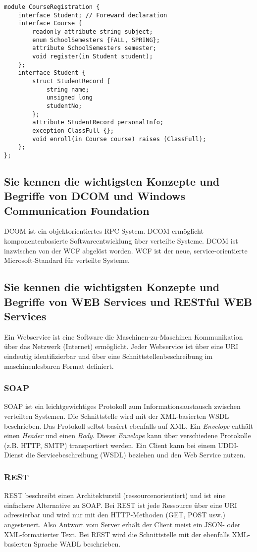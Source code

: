 \begin{lstlisting}[language=IDL, caption={Interface Definition Language (IDL) Beispiel}, label=lst:idl]
module CourseRegistration { 
	interface Student; // Foreward declaration 
	interface Course { 
		readonly attribute string subject; 
		enum SchoolSemesters {FALL, SPRING}; 
		attribute SchoolSemesters semester; 
		void register(in Student student); 
	}; 
	interface Student {
		struct StudentRecord { 
			string name; 
			unsigned long 
			studentNo; 
		}; 
		attribute StudentRecord personalInfo; 
		exception ClassFull {}; 
		void enroll(in Course course) raises (ClassFull); 
	}; 
};
\end{lstlisting}

\subsection{Sie kennen die wichtigsten Konzepte und Begriffe von DCOM und Windows Communication Foundation}

\ac{DCOM} ist ein objektorientiertes RPC System. DCOM ermöglicht komponentenbasierte Softwareentwicklung über verteilte Systeme. \ac{DCOM} ist inzwischen von der \ac{WCF} abgelöst worden. \ac{WCF} ist der neue, service-orientierte Microsoft-Standard für verteilte Systeme. 

\subsection{Sie kennen die wichtigsten Konzepte und Begriffe von WEB Services und RESTful WEB Services}

Ein Webservice ist eine Software die Maschinen-zu-Maschinen Kommunikation über das Netzwerk (Internet) ermöglicht. Jeder Webservice ist über eine \ac{URI} eindeutig identifizierbar und über eine Schnittstellenbeschreibung im maschinenlesbaren Format definiert.

\subsubsection{SOAP}

SOAP ist ein leichtgewichtiges Protokoll zum Informationsaustausch zwischen verteilten Systemen. Die Schnittstelle wird mit der XML-basierten \ac{WSDL} beschrieben. Das Protokoll selbst basiert ebenfalls auf XML. Ein \emph{Envelope} enthält einen \emph{Header} und einen \emph{Body}. Dieser \emph{Envelope} kann über verschiedene Protokolle (z.B. HTTP, SMTP) transportiert werden. Ein Client kann bei einem \acs{UDDI}-Dienst die Servicebeschreibung (\ac{WSDL}) beziehen und den Web Service nutzen.

\subsubsection{REST}

REST beschreibt einen Architekturstil (ressourcenorientiert) und ist eine einfachere Alternative zu SOAP. Bei REST ist jede Ressource über eine \ac{URI} adressierbar und wird nur mit den HTTP-Methoden (GET, POST usw.) angesteuert. Also Antwort vom Server erhält der Client meist ein JSON- oder XML-formatierter Text. Bei REST wird die Schnittstelle mit der ebenfalls XML-basierten Sprache \ac{WADL} beschrieben.